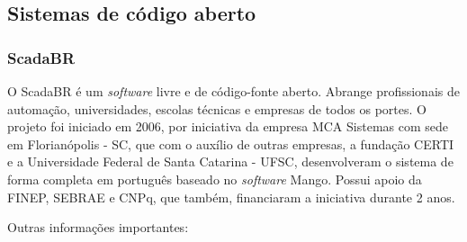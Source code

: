 \subsection{Sistemas de código aberto}
\label{sec:sistemas-aberto}

\subsubsection{ScadaBR}
\label{sec:scadabr}

    O ScadaBR \cite{ScadaBR} é um \textit{software} livre e de código-fonte aberto. Abrange profissionais de automação, universidades, escolas técnicas e empresas de todos os portes. O projeto foi iniciado em 2006, por iniciativa da empresa MCA Sistemas com sede em Florianópolis - SC, que com o auxílio de outras empresas, a fundação CERTI e a Universidade Federal de Santa Catarina - UFSC, desenvolveram o sistema de forma completa em português baseado no \textit{software} Mango. Possui apoio da FINEP, SEBRAE e CNPq, que também, financiaram a iniciativa durante 2 anos.

    \begin{figure}[!h]
    \end{figure}
    
    Outras informações importantes:
    
